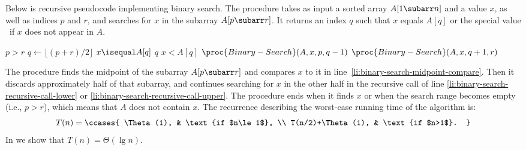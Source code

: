
\noindent Below is recursive pseudocode implementing binary search.
The procedure takes as input a sorted array $A[1\subarr n]$ and a value $x$, as well as indices $p$ and $r$, and searches for $x$ in the subarray $A[p\subarr r]$.
It returns an index $q$ such that $x$ equals $A[q]$ or the special value \nil\ if $x$ does not appear in $A$.

\begin{codebox}
\li \If $p>r$
\li     \Then \Return \nil
        \End
\li $q\gets\lfloor(p+r)/2\rfloor$
\li \If $x\isequal A[q]$ \label{li:binary-search-midpoint-compare}
\li     \Then \Return $q$
        \End
\li \If $x<A[q]$
\li     \Then \Return $\proc{Binary-Search}(A,x,p,q-1)$ \label{li:binary-search-recursive-call-lower}
\li     \Else \Return $\proc{Binary-Search}(A,x,q+1,r)$ \label{li:binary-search-recursive-call-upper}
        \End
\end{codebox}

The procedure finds the midpoint of the subarray $A[p\subarr r]$ and compares $x$ to it in line~\ref{li:binary-search-midpoint-compare}.
Then it discards approximately half of that subarray, and continues searching for $x$ in the other half in the recursive call of line \ref{li:binary-search-recursive-call-lower} or \ref{li:binary-search-recursive-call-upper}.
The procedure ends when it finds $x$ or when the search range becomes empty (i.e., $p>r$), which means that $A$ does not contain $x$.
The recurrence describing the worst-case running time of the algorithm is:
\[
    T(n) =
    \ccases{
        \Theta(1), & \text{if $n\le1$}, \\
        T(n/2)+\Theta(1), & \text{if $n>1$}.
    }
\]
In  we show that $T(n)=\Theta(\lg n)$.
